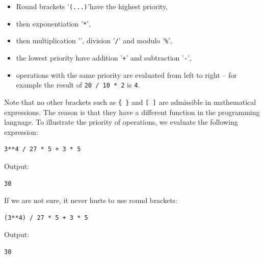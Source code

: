 \documentclass[article,A4,12pt]{llncs}
\begin{document}
\begin{itemize} 
\item Round brackets '{\tt (...)}'have the highest priority,
\item then exponentiation '{\tt **}', 
\item then multiplication '{\tt *}', division '{\tt /}' and modulo '{\tt \%}', 
\item the lowest priority have addition '{\tt +}' and subtraction '{\tt -}',
\item operations with the same priority are evaluated from left to right -- for
      example the result of {\tt 20 / 10 * 2} is {\tt 4}. 
\end{itemize}
Note that no other brackets such as {\tt \{ \}} and {\tt [ ]} are 
admissible in mathematical expressions. The reason is that they have a different 
function in the programming language.
To illustrate the priority of operations, we evaluate the following 
expression:\\

\begin{bbox}
\begin{verbatim}
3**4 / 27 * 5 + 3 * 5
\end{verbatim}
\end{bbox}
\vspace{6mm}

\noindent
Output:\\

\begin{ybox}
\begin{verbatim}
30
\end{verbatim}
\end{ybox}
\vspace{6mm}

\noindent
If we are not sure, it never hurts to use round brackets:\\

\begin{bbox}
\begin{verbatim}
(3**4) / 27 * 5 + 3 * 5
\end{verbatim}
\end{bbox}
\vspace{6mm}

\noindent
Output:\\

\begin{ybox}
\begin{verbatim}
30
\end{verbatim}
\end{ybox}
\vspace{6mm}
\end{document}
